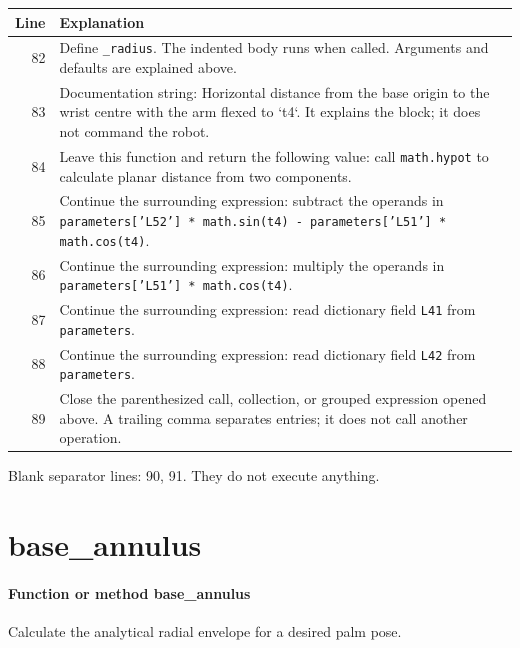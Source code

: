 \documentclass[11pt,a4paper]{book}
\begin{document}
\begin{longtable}{r p{}}

\textbf{Line} & \textbf{Explanation} \\ \hline \endhead

82 & Define \texttt{\_radius}. The indented body runs when called. Arguments and defaults are explained above. \\

83 & Documentation string: Horizontal distance from the base origin to the wrist centre with the arm flexed to `t4`. It explains the block; it does not command the robot. \\

84 & Leave this function and return the following value: call \texttt{math.hypot} to calculate planar distance from two components. \\

85 & Continue the surrounding expression: subtract the operands in \texttt{parameters['L52'] * math.sin(t4) - parameters['L51'] * math.cos(t4)}. \\

86 & Continue the surrounding expression: multiply the operands in \texttt{parameters['L51'] * math.cos(t4)}. \\

87 & Continue the surrounding expression: read dictionary field \texttt{L41} from \texttt{parameters}. \\

88 & Continue the surrounding expression: read dictionary field \texttt{L42} from \texttt{parameters}. \\

89 & Close the parenthesized call, collection, or grouped expression opened above. A trailing comma separates entries; it does not call another operation. \\

\end{longtable}

Blank separator lines: 90, 91. They do not execute anything.

\section{base\_annulus}

\paragraph{Function or method base\_annulus}
Calculate the analytical radial envelope for a desired palm pose.
\end{document}
